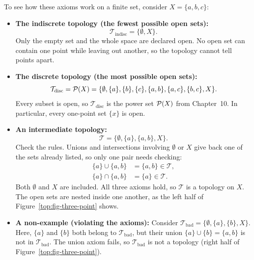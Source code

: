 \begin{example}
To see how these axioms work on a finite set, consider $X = \{a, b, c\}$:
\begin{itemize}
\item \textbf{The indiscrete topology (the fewest possible open sets):}
\[
\mathcal{T}_{\text{indisc}} = \{\emptyset, X\}.
\]
Only the empty set and the whole space are declared open. No open set can contain one point while leaving out another, so the topology cannot tell points apart.
\item \textbf{The discrete topology (the most possible open sets):}
\[
\mathcal{T}_{\text{disc}} = \mathcal{P}(X) = \{\emptyset, \{a\}, \{b\}, \{c\}, \{a, b\}, \{a, c\}, \{b, c\}, X\}.
\]
Every subset is open, so $\mathcal{T}_{\text{disc}}$ is the power set $\mathcal{P}(X)$ from Chapter~10. In particular, every one-point set $\{x\}$ is open.
\item \textbf{An intermediate topology:}
\[
\mathcal{T} = \{\emptyset, \{a\}, \{a, b\}, X\}.
\]
Check the rules. Unions and intersections involving $\emptyset$ or $X$ give back one of the sets already listed, so only one pair needs checking:
\begin{align*}
\{a\} \cup \{a, b\} &= \{a, b\} \in \mathcal{T}, \\
\{a\} \cap \{a, b\} &= \{a\} \in \mathcal{T}.
\end{align*}
Both $\emptyset$ and $X$ are included. All three axioms hold, so $\mathcal{T}$ is a topology on $X$. The open sets are nested inside one another, as the left half of Figure~\ref{top:fig-three-point} shows.
\item \textbf{A non-example (violating the axioms):}
Consider $\mathcal{T}_{\text{bad}} = \{\emptyset, \{a\}, \{b\}, X\}$.
Here, $\{a\}$ and $\{b\}$ both belong to $\mathcal{T}_{\text{bad}}$, but their union $\{a\} \cup \{b\} = \{a, b\}$ is not in $\mathcal{T}_{\text{bad}}$.
The union axiom fails, so $\mathcal{T}_{\text{bad}}$ is not a topology (right half of Figure~\ref{top:fig-three-point}).
\end{itemize}
\end{example}

